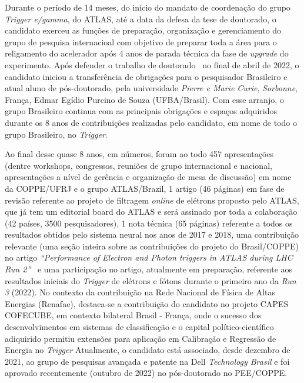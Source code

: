 Durante o período de 14 meses, do início do mandato de coordenação do grupo \emph{Trigger e/gamma}, do ATLAS, até 
a data da defesa da tese de doutorado, o candidato exerceu as funções de preparação, organização 
e gerenciamento do grupo de pesquisa internacioal com objetivo de preparar toda a área para o religamento do 
acelerador após 4 anos de parada técnica da fase de \emph{upgrade} do experimento. 
Após defender o trabalho de doutorado~\cite{tese_joao} no 
final de abril de 2022, o candidato iniciou a transferência de obrigações para o pesquisador Brasileiro e 
atual aluno de pós-doutorado, pela universidade \emph{Pierre e Marie Curie}, \emph{Sorbonne}, França, Edmar Egídio 
Purcino de Souza (UFBA/Brasil). Com esse arranjo, o grupo Brasileiro continua com as principais obrigações 
e espaços adquiridos durante os 8 anos de contribuições realizadas pelo candidato, em nome de todo o grupo 
Brasileiro, no \emph{Trigger}. 


Ao final desse quase 8 anos, em números, foram ao todo 457 apresentações (dentre workshops, congressos, reuniões 
de grupo internacional e nacional, apresentações a nível de gerência e organização de mesa de discussão) em 
nome da COPPE/UFRJ e o grupo ATLAS/Brazil, 1 artigo (46 páginas) em fase de revisão referente ao projeto de 
filtragem \emph{online} de elétrons proposto pelo ATLAS, que já tem um editorial board do ATLAS e será assinado 
por toda a colaboração (42 países, 3500 pesquisadores), 1 nota técnica (65 páginas) referente a todos os 
resultados obtidos pelo sistema neural nos anos de 2017 e 2018, uma contribuição relevante (uma seção inteira 
sobre as contribuições do projeto do Brasil/COPPE) no artigo \emph{“Performance of Electron and Photon triggers 
in ATLAS during LHC Run 2”}~\cite{paper_egamma_run2} e uma participação no artigo, atualmente em 
preparação, referente aos resultados 
iniciais do \emph{Trigger} de elétrons e fótons durante o primeiro ano da \emph{Run 3} (2022). 
No contexto da contribuição na Rede Nacional de Física de Altas Energias (Renafae), destaca-se a contribuição
do candidato no projeto CAPES COFECUBE, em contexto bilateral Brasil - França, onde o sucesso dos 
desenvolvimentos em sistemas de classificação e o capital político-científico adiquirido 
permitiu extensões para aplicação em Calibração e Regressão de Energia no \emph{Trigger}
Atualmente, o candidato está 
associado, desde dezembro de 2021, ao grupo de pesquisas avançada e patente na Dell \emph{Technology Brasil} e foi 
aprovado recentemente (outubro de 2022) no pós-doutorado no PEE/COPPE.



